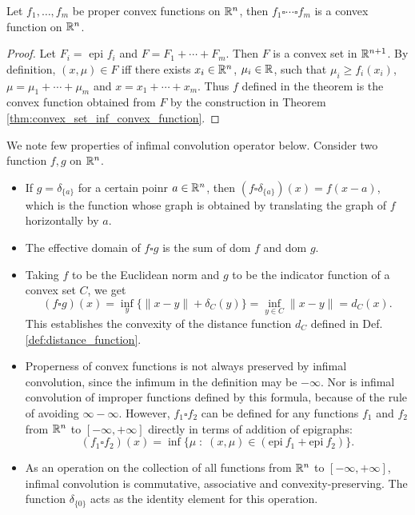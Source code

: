 \documentclass[11pt,a4paper]{article}
\begin{document}
\begin{proposition}
    Let $f_1,\ldots,f_m$ be proper convex functions on $\mathbb{R}^n$, then $f_1\square \cdots \square f_m$ is a convex function on $\mathbb{R}^n$.
\end{proposition}

\begin{proof}
    Let $F_i =$ epi $f_i$ and $F = F_1+\cdots + F_m$. Then $F$ is a convex set in $\mathbb{R}^{n+1}$. By definition, $(x,\mu)\in F$ iff there exists $x_i\in \mathbb{R}^n$, $\mu_i\in \mathbb{R}$, such that $\mu_i\ge f_i(x_i)$, $\mu = \mu_1+\cdots+\mu_m$ and $x = x_1+\cdots + x_m$. Thus $f$ defined in the theorem is the convex function obtained from $F$ by the construction in Theorem \ref{thm:convex_set_inf_convex_function}.
\end{proof}

\begin{remark}
    We note few properties of infimal convolution operator below. Consider two function $f,g$ on $\mathbb{R}^n$.
    \begin{itemize}
        \item If $g = \delta_{\{a\}}$ for a certain poinr $a\in \mathbb{R}^n$, then $(f\square \delta_{\{a\}})(x) = f(x-a)$, which is the function whose graph is obtained by translating the graph of $f$ horizontally by $a$.
        \item The effective domain of $f\square g$ is the sum of dom $f$ and dom $g$.
        \item Taking $f$ to be the Euclidean norm and $g$ to be the indicator function of a convex set $C$, we get
        \begin{equation*}
            (f\square g)(x) = \inf_y \{\|x-y\|+\delta_C(y)\} = \inf_{y\in C} \|x-y\| = d_C(x).
        \end{equation*}
        This establishes the convexity of the distance function $d_C$ defined in Def. \ref{def:distance_function}.
        \item Properness of convex functions is not always preserved by infimal convolution, since the infimum in the definition may be $-\infty$. Nor is infimal convolution of improper functions defined by this formula, because of the rule of avoiding $\infty-\infty$. However, $f_1\square f_2$ can be defined for any functions $f_1$ and $f_2$ from $\mathbb{R}^n$ to $[-\infty,+\infty]$ directly in terms of addition of epigraphs:
        \begin{equation*}
            (f_1\square f_2)(x) = \inf\{\mu\;:\; (x,\mu)\in (\text{epi}\ f_1+\text{epi}\ f_2)\}.
        \end{equation*}
        \item As an operation on the collection of all functions from $\mathbb{R}^n$ to $[-\infty,+\infty]$, infimal convolution is commutative, associative and convexity-preserving. The function $\delta_{\{0\}}$ acts as the identity element for this operation. 
    \end{itemize}
\end{remark}
\end{document}
